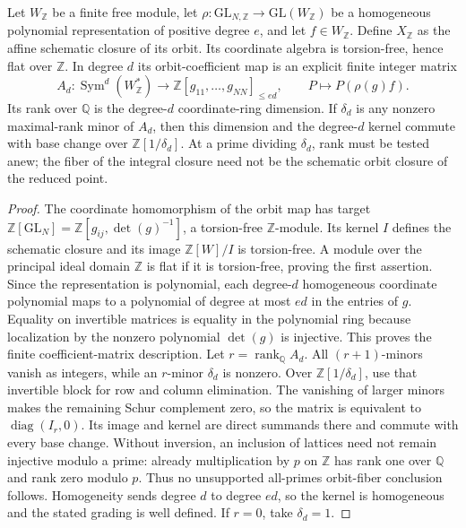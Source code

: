 \begin{proposition}\label{G-04}
Let $W_{\mathbb Z}$ be a finite free module, let $\rho:\mathrm{GL}_{N,\mathbb Z}\to\mathrm{GL}(W_{\mathbb Z})$ be a homogeneous polynomial representation of positive degree $e$, and let $f\in W_{\mathbb Z}$. Define $X_{\mathbb Z}$ as the affine schematic closure of its orbit. Its coordinate algebra is torsion-free, hence flat over $\mathbb Z$. In degree $d$ its orbit-coefficient map is an explicit finite integer matrix
\[
 A_d:\operatorname{Sym}^d(W_{\mathbb Z}^*)\longrightarrow
 \mathbb Z[g_{11},\ldots,g_{NN}]_{\leq ed},\qquad P\longmapsto P(\rho(g)f).
\]
Its rank over $\mathbb Q$ is the degree-$d$ coordinate-ring dimension. If $\delta_d$ is any nonzero maximal-rank minor of $A_d$, then this dimension and the degree-$d$ kernel commute with base change over $\mathbb Z[1/\delta_d]$. At a prime dividing $\delta_d$, rank must be tested anew; the fiber of the integral closure need not be the schematic orbit closure of the reduced point.
\end{proposition}
\begin{proof}
The coordinate homomorphism of the orbit map has target $\mathbb Z[\mathrm{GL}_N]=\mathbb Z[g_{ij},\det(g)^{-1}]$, a torsion-free $\mathbb Z$-module. Its kernel $I$ defines the schematic closure and its image $\mathbb Z[W]/I$ is torsion-free. A module over the principal ideal domain $\mathbb Z$ is flat if it is torsion-free, proving the first assertion. Since the representation is polynomial, each degree-$d$ homogeneous coordinate polynomial maps to a polynomial of degree at most $ed$ in the entries of $g$. Equality on invertible matrices is equality in the polynomial ring because localization by the nonzero polynomial $\det(g)$ is injective. This proves the finite coefficient-matrix description.
Let $r=\operatorname{rank}_{\mathbb Q}A_d$. All $(r+1)$-minors vanish as integers, while an $r$-minor $\delta_d$ is nonzero. Over $\mathbb Z[1/\delta_d]$, use that invertible block for row and column elimination. The vanishing of larger minors makes the remaining Schur complement zero, so the matrix is equivalent to $\operatorname{diag}(I_r,0)$. Its image and kernel are direct summands there and commute with every base change. Without inversion, an inclusion of lattices need not remain injective modulo a prime: already multiplication by $p$ on $\mathbb Z$ has rank one over $\mathbb Q$ and rank zero modulo $p$. Thus no unsupported all-primes orbit-fiber conclusion follows. Homogeneity sends degree $d$ to degree $ed$, so the kernel is homogeneous and the stated grading is well defined. If $r=0$, take $\delta_d=1$.
\end{proof}

